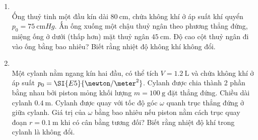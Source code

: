 \begin{enumerate}[label=\bfseries Câu \arabic*:, leftmargin=1.7cm]
\item {}\\
Ống thuỷ tinh một đầu kín dài $\SI{80}{\centi\meter}$, chứa không khí ở áp suất khí quyển $p_0=\SI{75}{\centi\meter Hg}$. Ấn ống xuống một chậu thuỷ ngân theo phương thẳng đứng, miệng ống ở dưới (thấp hơn) mặt thuỷ ngân $\SI{45}{\centi\meter}$. Độ cao cột thuỷ ngân đi vào ống bằng bao nhiêu? Biết rằng nhiệt độ không khí không đổi.

\item {}\\
Một cylanh nằm ngang kín hai đầu, có thể tích $V=\SI{1.2}{\liter}$ và chứa không khí ở áp suất $p_0=\SI{E5}{\newton/\meter^2}$. Cylanh được chia thành 2 phần bằng nhau bởi piston mỏng khối lượng $m=\SI{100}{\gram}$ đặt thẳng đứng. Chiều dài cylanh $\SI{0.4}{\meter}$. Cylanh được quay với tốc độ góc $\omega$ quanh trục thẳng đứng ở giữa cylanh. Giá trị của $\omega$ bằng bao nhiêu nếu piston nằm cách trục quay đoạn $r=\SI{0.1}{\meter}$ khi có cân bằng tương đối? Biết rằng nhiệt độ khí trong cylanh là không đổi.


\end{enumerate}
